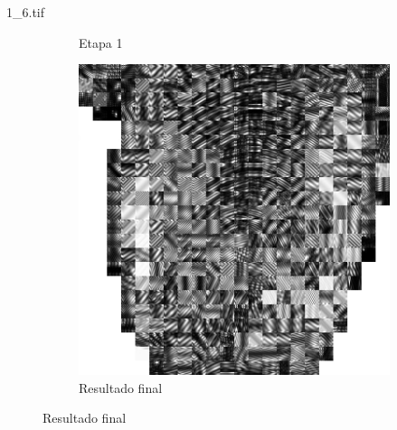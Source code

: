 \documentclass{beamer}
\begin{document}
\begin{frame}{1\_6.tif}
\begin{figure}
\begin{subfigure}[!ht]{0.32\textwidth}
                \caption{Etapa 1}
            \end{subfigure}
            \begin{subfigure}[!ht]{0.32\textwidth}
                \includegraphics[width=\columnwidth]{Fingerprints/1_6_final.jpg}
                \caption{Resultado final}
            \end{subfigure}
        \end{figure}
    \end{frame}
\end{document}
